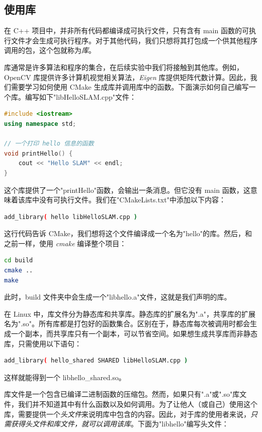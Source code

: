 \subsection{使用库}
在 C++ 项目中，并非所有代码都编译成可执行文件，只有含有 main 函数的可执行文件才会生成可执行程序。对于其他代码，我们只想将其打包成一个供其他程序调用的包，这个包就称为\textit{库}。

库通常是许多算法和程序的集合，在后续实验中我们将接触到其他库。例如，OpenCV 库提供许多计算机视觉相关算法，\textit{Eigen} 库提供矩阵代数计算。因此，我们需要学习如何使用 CMake 生成库并调用库中的函数。下面演示如何自己编写一个库。编写如下"libHelloSLAM.cpp"文件：

\begin{lstlisting}[language=c++,caption=slambook2/ch2/libHelloSLAM.cpp]
#include <iostream>
using namespace std;

// 一个打印 hello 信息的函数
void printHello() {
    cout << "Hello SLAM" << endl;
}
\end{lstlisting}
这个库提供了一个"printHello"函数，会输出一条消息。但它没有 main 函数，这意味着该库中没有可执行文件。我们在"CMakeLists.txt"中添加以下内容：
\begin{lstlisting}[language=sh,caption=slambook2/ch2/CMakeLists.txt]
add_library( hello libHelloSLAM.cpp )
\end{lstlisting}
这行代码告诉 CMake，我们想将这个文件编译成一个名为"hello"的库。然后，和之前一样，使用 \textit{cmake} 编译整个项目：
\begin{lstlisting}[language=sh,caption=终端输入]
cd build
cmake ..
make
\end{lstlisting}
此时，build 文件夹中会生成一个"libhello.a"文件，这就是我们声明的库。

在 Linux 中，库文件分为静态库和共享库。静态库的扩展名为".a"，共享库的扩展名为".so"。所有库都是打包好的函数集合。区别在于，静态库每次被调用时都会生成一个副本，而共享库只有一个副本，可以节省空间。如果想生成共享库而非静态库，只需使用以下语句：

\begin{lstlisting}[language=sh,caption=slambook2/ch2/CMakeLists.txt]
add_library( hello_shared SHARED libHelloSLAM.cpp )
\end{lstlisting}
这样就能得到一个 libhello\_shared.so。

库文件是一个包含已编译二进制函数的压缩包。然而，如果只有".a"或".so"库文件，我们并不知道其中有什么函数以及如何调用。为了让他人（或自己）使用这个库，需要提供一个\textit{头文件}来说明库中包含的内容。因此，对于库的使用者来说，\textit{只需获得头文件和库文件，就可以调用该库}。下面为"libhello"编写头文件：

